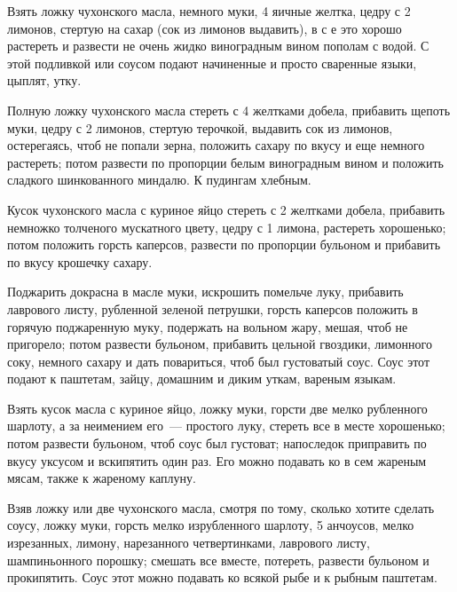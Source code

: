 
Взять ложку чухонского масла, немного муки, 4 яичные желтка, цедру с 2 лимонов, стертую на сахар (сок из лимонов выдавить), в с е это хорошо растереть и развести не очень жидко виноградным вином пополам с водой. С этой подливкой или соусом подают начиненные и просто сваренные языки, цыплят, утку. 


Полную ложку чухонского масла стереть с 4 желтками добела, прибавить щепоть муки, цедру с 2 лимонов, стертую терочкой, выдавить сок из лимонов, остерегаясь, чтоб не попали зерна, положить сахару по вкусу и еще немного растереть; потом развести по пропорции белым виноградным вином и положить сладкого шинкованного миндалю. К пудингам хлебным. 


Кусок чухонского масла с куриное яйцо стереть с 2 желтками добела, прибавить немножко толченого мускатного цвету, цедру с 1 лимона, растереть хорошенько; потом положить горсть каперсов, развести по пропорции бульоном и прибавить по вкусу крошечку сахару. 


Поджарить докрасна в масле муки, искрошить помельче луку, прибавить лаврового листу, рубленной зеленой петрушки, горсть каперсов положить в горячую поджаренную муку, подержать на вольном жару, мешая, чтоб не пригорело; потом развести бульоном, прибавить цельной гвоздики, лимонного соку, немного сахару и дать повариться, чтоб был густоватый соус. Соус этот подают к паштетам, зайцу, домашним и диким уткам, вареным языкам. 


Взять кусок масла с куриное яйцо, ложку муки, горсти две мелко рубленного шарлоту, а за неимением его~--- простого луку, стереть все в месте хорошенько; потом развести бульоном, чтоб соус был густоват; напоследок приправить по вкусу уксусом и вскипятить один раз. Его можно подавать ко в сем жареным мясам, также к жареному каплуну. 


Взяв ложку или две чухонского масла, смотря по тому, сколько хотите сделать соусу, ложку муки, горсть мелко изрубленного шарлоту, 5 анчоусов, мелко изрезанных, лимону, нарезанного четвертинками, лаврового листу, шампиньонного порошку; смешать все вместе, потереть, развести бульоном и прокипятить. Соус этот можно подавать ко всякой рыбе и к рыбным паштетам. 

